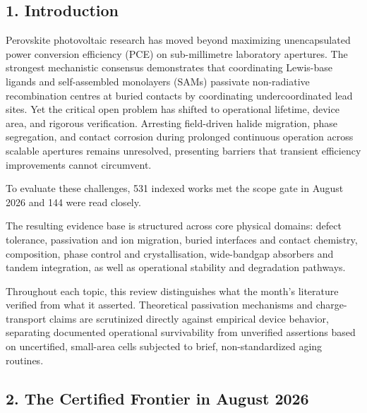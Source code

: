 \documentclass[
  11pt,
]{article}
\begin{document}
\subsection{1. Introduction}\label{introduction}

Perovskite photovoltaic research has moved beyond maximizing
unencapsulated power conversion efficiency (PCE) on sub-millimetre
laboratory apertures. The strongest mechanistic consensus demonstrates
that coordinating Lewis-base ligands and self-assembled monolayers
(SAMs) passivate non-radiative recombination centres at buried contacts
by coordinating undercoordinated lead sites. Yet the critical open
problem has shifted to operational lifetime, device area, and rigorous
verification. Arresting field-driven halide migration, phase
segregation, and contact corrosion during prolonged continuous operation
across scalable apertures remains unresolved, presenting barriers that
transient efficiency improvements cannot circumvent.

To evaluate these challenges, 531 indexed works met the scope gate in
August 2026 and 144 were read closely.

The resulting evidence base is structured across core physical domains:
defect tolerance, passivation and ion migration, buried interfaces and
contact chemistry, composition, phase control and crystallisation,
wide-bandgap absorbers and tandem integration, as well as operational
stability and degradation pathways.

Throughout each topic, this review distinguishes what the month's
literature verified from what it asserted. Theoretical passivation
mechanisms and charge-transport claims are scrutinized directly against
empirical device behavior, separating documented operational
survivability from unverified assertions based on uncertified,
small-area cells subjected to brief, non-standardized aging routines.

\subsection{2. The Certified Frontier in August
2026}\label{the-certified-frontier-in-august-2026}
\end{document}
